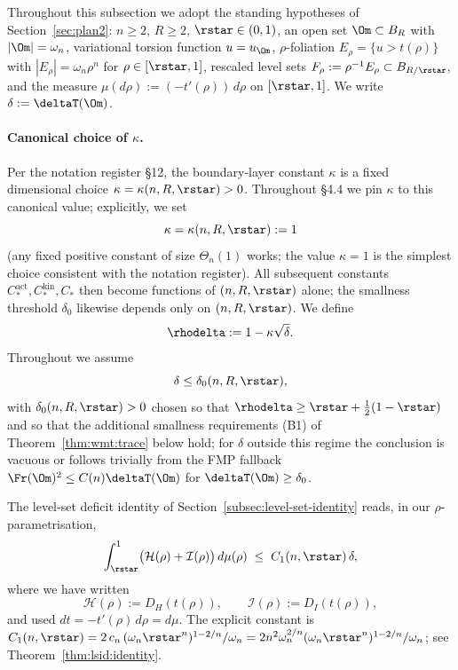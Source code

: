 Throughout this subsection we adopt the standing hypotheses of
Section~\ref{sec:plan2}: $n\ge 2$, $R\ge 2$, $\rstar\in(0,1)$, an open set
$\Om\subset B_R$ with $|\Om|=\omega_n$, variational torsion function
$u=u_\Om$, $\rho$-foliation $E_\rho=\{u>t(\rho)\}$ with
$|E_\rho|=\omega_n\rho^n$ for $\rho\in[\rstar,1]$, rescaled level sets
$F_\rho:=\rho^{-1}E_\rho\subset B_{R/\rstar}$, and the measure
$\mu(d\rho):=(-t'(\rho))\,d\rho$ on $[\rstar,1]$. We write
$\delta:=\deltaT(\Om)$.

\paragraph{Canonical choice of $\kappa$.}
Per the notation register \S12, the boundary-layer constant $\kappa$ is
a fixed dimensional choice $\kappa=\kappa(n,R,\rstar)>0$. Throughout
\S4.4 we pin $\kappa$ to this canonical value; explicitly, we set
\[
   \kappa=\kappa(n,R,\rstar):=1
\]
(any fixed positive constant of size $\Theta_n(1)$ works; the value
$\kappa=1$ is the simplest choice consistent with the notation
register). All subsequent constants $C_*^{\mathrm{act}},
C_*^{\mathrm{kin}}, C_*$ then become functions of $(n,R,\rstar)$ alone;
the smallness threshold $\delta_0$ likewise depends only on
$(n,R,\rstar)$. We define
\[
   \rhodelta:=1-\kappa\sqrt{\delta}.
\]
Throughout we assume
\begin{equation}\label{eq:wmt:delta-small}
   \delta\le\delta_0(n,R,\rstar),
\end{equation}
with $\delta_0(n,R,\rstar)>0$ chosen so that
$\rhodelta\ge\rstar+\tfrac12(1-\rstar)$ and so that the additional
smallness requirements (B1) of Theorem~\ref{thm:wmt:trace} below hold;
for $\delta$ outside this regime the conclusion is vacuous or follows
trivially from the FMP fallback $\Fr(\Om)^2\le C(n)\deltaT(\Om)$ for
$\deltaT(\Om)\ge\delta_0$.

The level-set deficit identity of Section~\ref{subsec:level-set-identity}
reads, in our $\rho$-parametrisation,
\begin{equation}\label{eq:wmt:DH-DI-int}
   \int_{\rstar}^{1}
      \bigl(\mathcal H(\rho)+\mathcal I(\rho)\bigr)\,d\mu(\rho)
   \;\le\; C_1(n,\rstar)\,\delta,
\end{equation}
where we have written
\[
   \mathcal H(\rho):=D_H(t(\rho)),\qquad
   \mathcal I(\rho):=D_I(t(\rho)),
\]
and used $dt=-t'(\rho)\,d\rho=d\mu$. The explicit constant is
$C_1(n,\rstar)=2\,c_n\,(\omega_n\rstar^n)^{1-2/n}/\omega_n
=2n^2\omega_n^{2/n}(\omega_n\rstar^n)^{1-2/n}/\omega_n$; see
Theorem~\ref{thm:lsid:identity}.

